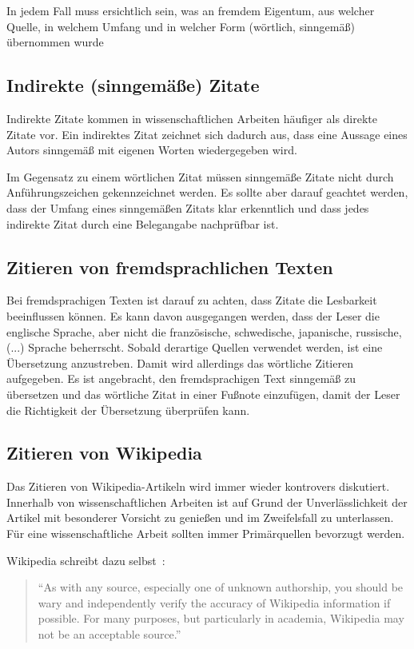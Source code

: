 In jedem Fall muss ersichtlich sein, was an fremdem Eigentum, aus welcher Quelle, in welchem Umfang und in welcher Form (wörtlich, sinngemäß) übernommen wurde

\subsection{Indirekte (sinngemäße) Zitate}\label{sec:citations:indirect}
%
Indirekte Zitate kommen in wissenschaftlichen Arbeiten häufiger als direkte Zitate vor. Ein indirektes Zitat zeichnet sich dadurch aus, dass eine Aussage eines Autors sinngemäß mit eigenen Worten wiedergegeben wird.

Im Gegensatz zu einem wörtlichen Zitat müssen sinngemäße Zitate nicht durch Anführungszeichen gekennzeichnet werden. Es sollte aber darauf geachtet werden, dass der Umfang eines sinngemäßen Zitats klar erkenntlich und dass jedes indirekte Zitat durch eine Belegangabe nachprüfbar ist.

\subsection{Zitieren von fremdsprachlichen Texten}\label{sec:citations:forgein_languages}
%
Bei fremdsprachigen Texten ist darauf zu achten, dass Zitate die Lesbarkeit beeinflussen können. Es kann davon ausgegangen werden, dass der Leser die englische Sprache, aber nicht die französische, schwedische, japanische, russische, (...) Sprache beherrscht. Sobald derartige Quellen verwendet werden, ist eine Übersetzung anzustreben. Damit wird allerdings das wörtliche Zitieren aufgegeben. Es ist angebracht, den fremdsprachigen Text sinngemäß zu übersetzen und das wörtliche Zitat in einer Fußnote einzufügen, damit der Leser die Richtigkeit der Übersetzung überprüfen kann.

\subsection{Zitieren von Wikipedia}\label{sec:citations:wikipedia}
%
Das Zitieren von Wikipedia-Artikeln wird immer wieder kontrovers diskutiert. Innerhalb von wissenschaftlichen Arbeiten ist auf Grund der Unverlässlichkeit der Artikel mit besonderer Vorsicht zu genießen und im Zweifelsfall zu unterlassen. Für eine wissenschaftliche Arbeit sollten immer Primärquellen bevorzugt werden.

Wikipedia schreibt dazu selbst~\cite{wikipedia:citing}:

\begin{quote}
  \enquote{As with any source, especially one of unknown authorship, you should be wary and independently verify the accuracy of Wikipedia information if possible. For many purposes, but particularly in academia, Wikipedia may not be an acceptable source.}
\end{quote}

